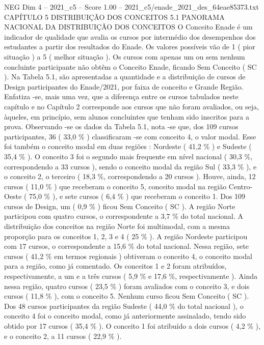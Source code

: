 \begin{textsample}{NEG Dim 4 – 2021\_c5 – Score 1.00 – 2021\_c5/enade\_2021\_des\_64eae85373.txt}  \label{ex:f4_neg_145}
CAPÍTULO 5 DISTRIBUIÇÃO DOS CONCEITOS 5.1 PANORAMA NACIONAL DA DISTRIBUIÇÃO DOS CONCEITOS O Conceito Enade é um indicador de qualidade que avalia os cursos por intermédio dos desempenhos dos estudantes a partir dos resultados do Enade.
Os valores possíveis vão de 1 ( pior situação ) a 5 ( melhor situação ).
Os cursos com apenas um ou sem nenhum concluinte participante não obtêm o Conceito Enade, ficando Sem Conceito ( SC ).
Na Tabela 5.1, são apresentadas a quantidade e a distribuição de cursos de Design participantes do Enade/2021, por faixa de conceito e Grande Região.
Enfatiza -se, mais uma vez, que a diferença entre os cursos tabulados neste capítulo e no Capítulo 2 corresponde aos cursos que não foram avaliados, ou seja, àqueles, em princípio, sem alunos concluintes que tenham sido inscritos para a prova.
Observando -se os dados da Tabela 5.1, nota -se que, dos 109 cursos participantes, 36 ( 33,0 \% ) classificaram -se com conceito 4, o valor modal.
Esse foi também o conceito modal em duas regiões : Nordeste ( 41,2 \% ) e Sudeste ( 35,4 \% ).
O conceito 3 foi o segundo mais frequente em nível nacional ( 30,3 \%, correspondendo a 33 cursos ), sendo o conceito modal da região Sul ( 33,3 \% ), e o conceito 2, o terceiro ( 18,3 \%, correspondendo a 20 cursos ).
Houve, ainda, 12 cursos ( 11,0 \% ) que receberam o conceito 5, conceito modal na região Centro-Oeste ( 75,0 \% ), e sete cursos ( 6,4 \% ) que receberam o conceito 1.
Dos 109 cursos de Design, um ( 0,9 \% ) ficou Sem Conceito ( SC ).
A região Norte participou com quatro cursos, o correspondente a 3,7 \% do total nacional.
A distribuição dos conceitos na região Norte foi multimodal, com a mesma proporção para os conceitos 1, 2, 3 e 4 ( 25 \% ).
A região Nordeste participou com 17 cursos, o correspondente a 15,6 \% do total nacional.
Nessa região, sete cursos ( 41,2 \% em termos regionais ) obtiveram o conceito 4, o conceito modal para a região, como já comentado.
Os conceitos 1 e 2 foram atribuídos, respectivamente, a um e a três cursos ( 5,9 \% e 17,6 \%, respectivamente ).
Ainda nessa região, quatro cursos ( 23,5 \% ) foram avaliados com o conceito 3, e dois cursos ( 11,8 \% ), com o conceito 5.
Nenhum curso ficou Sem Conceito ( SC ).
Dos 48 cursos participantes da região Sudeste ( 44,0 \% do total nacional ), o conceito 4 foi o conceito modal, como já anteriormente assinalado, tendo sido obtido por 17 cursos ( 35,4 \% ).
O conceito 1 foi atribuído a dois cursos ( 4,2 \% ), e o conceito 2, a 11 cursos ( 22,9 \% ).

\end{textsample}

